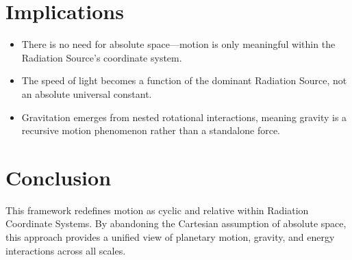 \documentclass{article}
\begin{document}
\section{Implications}
\begin{itemize}
    \item There is no need for absolute space—motion is only meaningful within the Radiation Source's coordinate system.
    \item The speed of light becomes a function of the dominant Radiation Source, not an absolute universal constant.
    \item Gravitation emerges from nested rotational interactions, meaning gravity is a recursive motion phenomenon rather than a standalone force.
\end{itemize}

\section{Conclusion}
This framework redefines motion as cyclic and relative within Radiation Coordinate Systems. By abandoning the Cartesian assumption of absolute space, this approach provides a unified view of planetary motion, gravity, and energy interactions across all scales.
\end{document}
